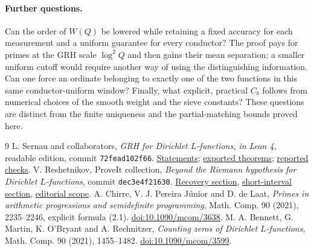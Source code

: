 \documentclass[11pt]{article}
\begin{document}
\paragraph{Further questions.}
Can the order of $W(Q)$ be lowered while retaining a fixed accuracy for each
measurement and a uniform guarantee for every conductor? The proof pays for
primes at the GRH scale $\log^2 Q$ and then gains their mean separation;
a smaller uniform cutoff would require another way of using the distinguishing
information. Can one force an ordinate belonging to exactly one of the two
functions in this same conductor-uniform window? Finally, what explicit,
practical $C_b$ follows from numerical choices of the smooth weight and the sieve
constants? These questions are distinct from the finite uniqueness and the
partial-matching bounds proved here.
\begin{thebibliography}{9}\small
{} L. Sernau and collaborators, \emph{GRH for Dirichlet
$L$-functions, in Lean 4}, readable edition, commit \texttt{72fead102f66}.
\href{https://github.com/lsernau/grh-lean/blob/72fead102f663d5c7a407964a13dc0cf9d977207/grh/src/Statements.lean}{Statements};
\href{https://github.com/lsernau/grh-lean/blob/72fead102f663d5c7a407964a13dc0cf9d977207/grh/src/Main.lean}{exported theorems};
\href{https://github.com/lsernau/grh-lean/blob/72fead102f663d5c7a407964a13dc0cf9d977207/grh/README.md}{reported checks}.
 V. Reshetnikov, ProveIt collection, \emph{Beyond the Riemann
hypothesis for Dirichlet $L$-functions}, commit \texttt{dec3e4f21630}.
\href{https://github.com/VladimirReshetnikov/ProveIt/blob/dec3e4f216305071186a1cc4c42fe1cdb38df9be/Analysis/GeneralizedRiemannHypothesis/Article/sections/rec.tex}{Recovery section},
\href{https://github.com/VladimirReshetnikov/ProveIt/blob/dec3e4f216305071186a1cc4c42fe1cdb38df9be/Analysis/GeneralizedRiemannHypothesis/Article/sections/zer.tex}{short-interval section},
\href{https://github.com/VladimirReshetnikov/ProveIt/blob/dec3e4f216305071186a1cc4c42fe1cdb38df9be/Analysis/GeneralizedRiemannHypothesis/Article/README.md}{editorial scope}.
 A. Chirre, V. J. Pereira J\'unior and D. de Laat,
\emph{Primes in arithmetic progressions and semidefinite programming},
Math. Comp. 90 (2021), 2235--2246, explicit formula (2.1).
\href{https://doi.org/10.1090/mcom/3638}{doi:10.1090/mcom/3638}.
 M. A. Bennett, G. Martin, K. O'Bryant and A. Rechnitzer,
\emph{Counting zeros of Dirichlet $L$-functions}, Math. Comp. 90 (2021),
1455--1482. \href{https://doi.org/10.1090/mcom/3599}{doi:10.1090/mcom/3599}.

\end{thebibliography}
\end{document}
